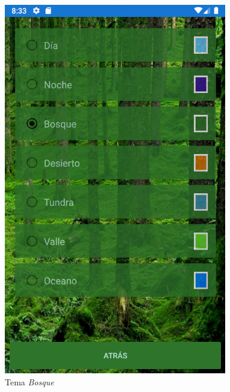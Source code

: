 \begin{figure}[H]
    \centering
    \includegraphics[scale=0.3]{Figures/Capturas/TemaBosque.png}
    \caption{Tema \textit{Bosque}}
    \label{Bosque}    
\end{figure}
